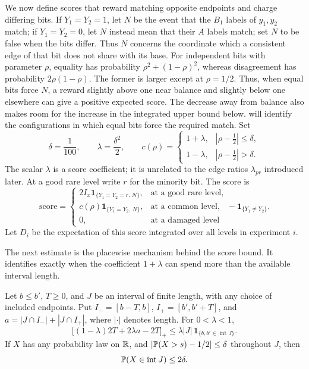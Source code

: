 We now define scores that reward matching opposite endpoints and
charge differing bits.  If $Y_1=Y_2=1$, let $N$ be the event that the
$B_1$ labels of $y_1,y_2$ match; if $Y_1=Y_2=0$, let $N$ instead
mean that their $A$ labels match; set $N$ to be false when the bits
differ.  Thus $N$ concerns the coordinate
which a consistent edge of that bit does not share with its base.
For independent bits with parameter $\rho$, equality has probability
$\rho^2+(1-\rho)^2$, whereas disagreement has probability
$2\rho(1-\rho)$. The former is larger except at $\rho=1/2$.
Thus, when equal bits force $N$, a reward slightly above one near
balance and slightly below one elsewhere can give a positive expected
score. The decrease away from balance also makes room for the
increase in the integrated upper bound below.
 will identify the configurations in which equal bits
force the required match.
Set
\[
 \delta=\frac1{100},\qquad \lambda=\frac{\delta^2}{2},\qquad
 c(\rho)=
 \begin{cases}
 1+\lambda,&|\rho-\tfrac12|\le\delta,\\
 1-\lambda,&|\rho-\tfrac12|>\delta.
 \end{cases}
\]
The scalar $\lambda$ is a score coefficient; it is unrelated to the
edge ratios $\lambda_{pr}$ introduced later.
At a good rare level write $r$ for the minority bit. The score is
\[
 \text{score}=
 \begin{cases}
 2I_x\mathbf1_{\{Y_1=Y_2=r,\,N\}},&\text{at a good rare level},\\
 c(\rho)\mathbf1_{\{Y_1=Y_2,\,N\}},&\text{at a common level},\\
 0,&\text{at a damaged level}
 \end{cases}
 -\mathbf1_{\{Y_1\ne Y_2\}}.
\]
Let $D_i$ be the expectation of this score integrated over all
levels in experiment $i$.

The next estimate is the placewise mechanism behind the score
bound.  It identifies exactly when the coefficient $1+\lambda$
can spend more than the available interval length.

\begin{lemma}\label{bud:intervals}
Let $b\le b'$, $T\ge0$, and $J$ be an interval of finite length,
with any choice of included endpoints.  Put
$I_-=[b-T,b]$, $I_+=[b',b'+T]$, and
$a=|J\cap I_-|+|J\cap I_+|$, where $|\cdot|$ denotes length.
For $0<\lambda<1$,
\begin{equation}\label{bud:central-envelope}
 \big[(1-\lambda)2T+2\lambda a-2T\big]_+
 \le\lambda|J|\,
       \mathbf1_{\{b,b'\in\operatorname{int}J\}}.
\end{equation}
If $X$ has any probability law on $\mathbb R$, and
$|\mathbb P(X>s)-1/2|\le\delta$ throughout $J$, then
\begin{equation}\label{bud:interior-mass}
 \mathbb P(X\in\operatorname{int}J)\le2\delta.
\end{equation}
\end{lemma}

